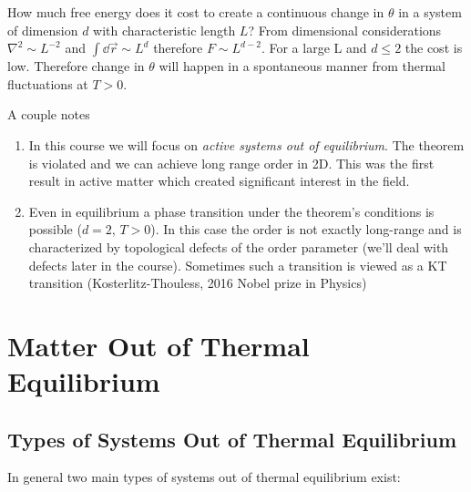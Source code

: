 How much free energy does it cost to create a continuous change in \(\theta \) in a system of dimension \(d\) with characteristic length \(L\)? From dimensional considerations \(\nabla^2 \sim L^{-2}\) and \(\int\dd \vec{r} \sim L^d\) therefore \(F\sim L^{d-2}\). For a large L and \(d\leq 2\) the cost is low. Therefore change in \(\theta \) will happen in a spontaneous manner from thermal fluctuations at \(T>0\).

A couple notes

\begin{enumerate}
	\item In this course we will focus on \emph{active systems out of equilibrium}. The theorem is violated and we can achieve long range order in 2D. This was the first result in active matter which created significant interest in the field.
	\item Even in equilibrium a phase transition under the theorem's conditions is possible (\(d=2\), \(T>0\)). In this case the order is not exactly long-range and is characterized by topological defects of the order parameter (we'll deal with defects later in the course). Sometimes such a transition is viewed as a KT transition (Kosterlitz-Thouless, 2016 Nobel prize in Physics)
\end{enumerate}

\clearpage
\section{Matter Out of Thermal Equilibrium}

\subsection{Types of Systems Out of Thermal Equilibrium}

In general two main types of systems out of thermal equilibrium exist:

